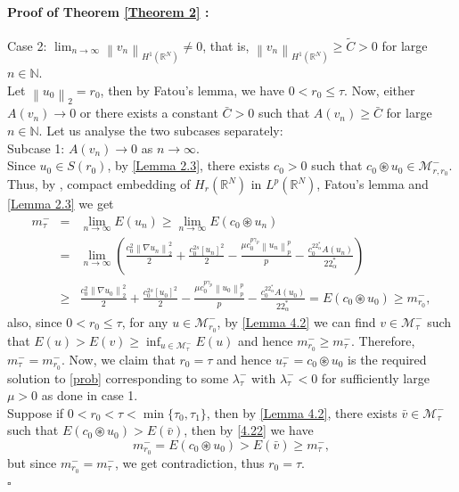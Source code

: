 \documentclass[11pt]{article}
\numberwithin{equation}{section}
\numberwithin{mytheorem}{section}
\newenvironment{myproof}[2] {\paragraph{Proof of {#1} {#2} :}}{\hfill$\square$}
\begin{document}
\begin{myproof}{Theorem}{\ref{Theorem 2}}
					Case 2: $\displaystyle \lim_{n\rightarrow \infty}\left\| v_n \right\|_{H^1(\mathbb{R}^N)}\neq 0$, that is, $\left\| v_n \right\|_{H^1(\mathbb{R}^N)} \geq \tilde{C}>0$ for large $n\in \mathbb{N}$.\\
					Let $\left\| u_0 \right\|_2=r_0$, then by Fatou's lemma, we have $0<r_0\leq \tau$. Now, either $A(v_n)\rightarrow 0$ or there exists a constant $\bar{C}>0$ such that $A(v_n)\geq \bar{C}$ for large $n\in \mathbb{N}$. Let us analyse the two subcases separately:\\
					Subcase 1: $A(v_n)\rightarrow 0$ as $n\rightarrow \infty$.\\
					Since $u_0\in S(r_0)$, by \autoref{Lemma 2.3}, there exists $c_0>0$ such that $c_0\circledast u_0 \in \mathcal{M}_{r,r_0}^-$. Thus, by \cite[lemma~2.4]{Moroz2013groundstates}, compact embedding of $H_r(\mathbb{R}^N)$ in $L^p(\mathbb{R}^N)$, Fatou's lemma and \autoref{Lemma 2.3} we get
					\begin{eqnarray}\label{4.22}
						m_{\tau}^- & = & \lim_{n\rightarrow \infty}E(u_n) \geq \lim_{n\rightarrow \infty}E(c_0 \circledast u_n) \nonumber\\
						& = & \lim_{n\rightarrow \infty}\left(\frac{c_0^2\left\| \nabla u_n \right\|_2^2}{2}+\frac{c_0^{2s}[u_n]^2}{2}-\frac{\mu c_0^{p\gamma_p}\left\| u_n \right\|_p^p}{p}-\frac{c_0^{22^*_{\alpha}}A(u_n)}{22^*_{\alpha}}\right)\nonumber\\
						& \geq & \frac{c_0^2\left\| \nabla u_0 \right\|_2^2}{2}+\frac{c_0^{2s}[u_0]^2}{2}-\frac{\mu c_0^{p\gamma_p}\left\| u_0 \right\|_p^p}{p}-\frac{c_0^{22^*_{\alpha}}A(u_0)}{22^*_{\alpha}}= E(c_0 \circledast u_0)\geq m_{r_0}^-,
					\end{eqnarray}
					also, since $0<r_0\leq \tau$, for any $u\in \mathcal{M}_{r_0}^-$, by \autoref{Lemma 4.2} we can find $v\in \mathcal{M}_{\tau}^-$ such that $E(u)>E(v)\geq \displaystyle \inf_{u\in \mathcal{M}_{\tau}^-}E(u)$ and hence $m_{r_0}^-\geq m_{\tau}^-$. Therefore, $m_{\tau}^-=m_{r_0}^-$. Now, we claim that $r_0=\tau$ and hence $u_{\tau}^-=c_0\circledast u_0$ is the required solution to \eqref{prob} corresponding to some $\lambda_{\tau}^-$ with $\lambda_{\tau}^-<0$ for sufficiently large $\mu>0$ as done in case 1.\\
					Suppose if $0<r_0<\tau<\min\{\tau_0,\tau_1\}$, then by \autoref{Lemma 4.2}, there exists $\bar{v}\in \mathcal{M}_{\tau}^-$ such that $E(c_0\circledast u_0)>E(\bar{v})$, then by \eqref{4.22} we have
					$$m_{r_0}^-=E(c_0\circledast u_0)>E(\bar{v})\geq m_{\tau}^-,$$
					but since $m_{r_0}^-=m_{\tau}^-$, we get contradiction, thus $r_0=\tau$.\\

\end{myproof}
\end{document}
